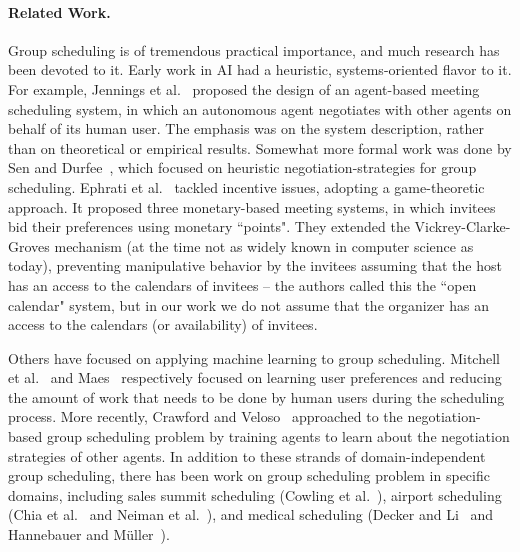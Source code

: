 \paragraph{Related Work.}
Group scheduling is of tremendous practical importance, and much research has been devoted to it. Early work in AI had a heuristic, systems-oriented flavor to it. For example, Jennings et al.~\cite{Jennings95agent} proposed the design of an agent-based meeting scheduling system, in which an autonomous agent negotiates with other agents on behalf of its human user. The emphasis was on the system description, rather than on theoretical or empirical results. Somewhat more formal work was done by Sen and Durfee~\cite{sen1998formal}, which focused on heuristic negotiation-strategies for group scheduling. Ephrati et al.~\cite{ephrati1994non} tackled incentive issues, adopting a game-theoretic approach. It proposed three monetary-based meeting systems, in which invitees bid their preferences using monetary ``points". They extended the Vickrey-Clarke-Groves mechanism (at the time not as widely known in computer science as today), preventing manipulative behavior by the invitees assuming that the host has an access to the calendars of invitees -- the authors called this the ``open calendar" system, but in our work we do not assume that the organizer has an access to the calendars (or availability) of invitees. 

Others have focused on applying machine learning to group scheduling. Mitchell et al.~\cite{mitchell1994experience} and Maes~\cite{maes1994agents} respectively focused on learning user preferences and reducing the amount of work that needs to be done by human users during the scheduling process. More recently, Crawford and Veloso~\cite{crawford2005learning} approached to the negotiation-based group scheduling problem by training agents to learn about the negotiation strategies of other agents. In addition to these strands of domain-independent group scheduling, there has been work on group scheduling problem in specific domains,  including sales summit scheduling (Cowling et al.~\cite{Cowling}), airport scheduling (Chia et al.~\cite{chia1998coordinating} and Neiman et al.~\cite{neiman1994exploiting}), and medical scheduling (Decker and Li~\cite{decker1998coordinated} and Hannebauer and M{\"u}ller~\cite{hannebauer2001distributed}).


